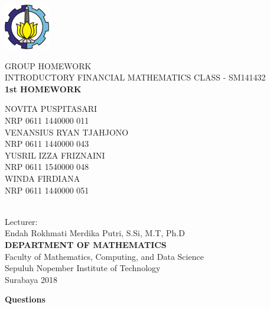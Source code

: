\documentclass{article}
\begin{document}
	{
		\thispagestyle{empty}
		\begin{flushleft}
			\includegraphics[width=75px]{lambang-its-color-std.png}\\
			{\selectfont
				\vspace{6cm}
				GROUP HOMEWORK\\
				INTRODUCTORY FINANCIAL MATHEMATICS CLASS - SM141432\\
				\vspace{0.2cm}
				\textbf{1st HOMEWORK}\vspace{0.4cm}
				
				\begin{minipage}{10cm}
					\flushleft
					NOVITA PUSPITASARI\\NRP 0611 1440000 011\\ \vspace{0.15cm}
					VENANSIUS RYAN TJAHJONO\\NRP 0611 1440000 043\\ \vspace{0.15cm}
					YUSRIL IZZA FRIZNAINI\\NRP 0611 1540000 048\\ \vspace{0.15cm}
					WINDA FIRDIANA\\NRP 0611 1440000 051\\ \vspace{0.15cm}
				\end{minipage}
				\\
				\vspace{1cm}
				Lecturer: \\
				Endah Rokhmati Merdika Putri, S.Si, M.T, Ph.D\\
				\vspace{1cm}
				\textbf{DEPARTMENT OF MATHEMATICS}\\
				Faculty of Mathematics, Computing, and Data Science\\
				Sepuluh Nopember Institute of Technology\\
				Surabaya 2018\\
			}
		\end{flushleft}
	}
	\pagebreak
	\textbf{Questions}\\
\end{document}

